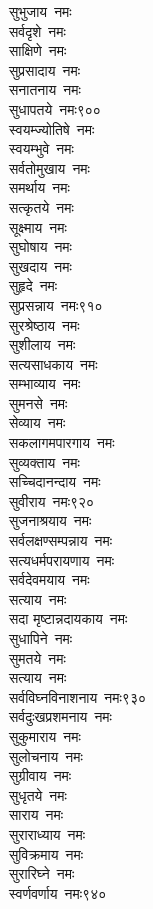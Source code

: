 \begin{multicols}{\maxColumns}
\begin{flushleft}
सुभुजाय~नमः\\
सर्वदृशे~नमः\\
साक्षिणे~नमः\\
सुप्रसादाय~नमः\\
सनातनाय~नमः\\
सुधापतये~नमः\hfill ९००\\
स्वयम्ज्योतिषे~नमः\\
स्वयम्भुवे~नमः\\
सर्वतोमुखाय~नमः\\
समर्थाय~नमः\\
सत्कृतये~नमः\\
सूक्ष्माय~नमः\\
सुघोषाय~नमः\\
सुखदाय~नमः\\
सुहृदे~नमः\\
सुप्रसन्नाय~नमः\hfill ९१०\\
सुरश्रेष्ठाय~नमः\\
सुशीलाय~नमः\\
सत्यसाधकाय~नमः\\
सम्भाव्याय~नमः\\
सुमनसे~नमः\\
सेव्याय~नमः\\
सकलागमपारगाय~नमः\\
सुव्यक्ताय~नमः\\
सच्चिदानन्दाय~नमः\\
सुवीराय~नमः\hfill ९२०\\
सुजनाश्रयाय~नमः\\
सर्वलक्षण्सम्पन्नाय~नमः\\
सत्यधर्मपरायणाय~नमः\\
सर्वदेवमयाय~नमः\\
सत्याय~नमः\\
सदा मृष्टान्नदायकाय~नमः\\
सुधापिने~नमः\\
सुमतये~नमः\\
सत्याय~नमः\\
सर्वविघ्नविनाशनाय~नमः\hfill ९३०\\
सर्वदुःखप्रशमनाय~नमः\\
सुकुमाराय~नमः\\
सुलोचनाय~नमः\\
सुग्रीवाय~नमः\\
सुधृतये~नमः\\
साराय~नमः\\
सुराराध्याय~नमः\\
सुविक्रमाय~नमः\\
सुरारिघ्ने~नमः\\
स्वर्णवर्णाय~नमः\hfill ९४०\\

\end{flushleft}
\end{multicols}
